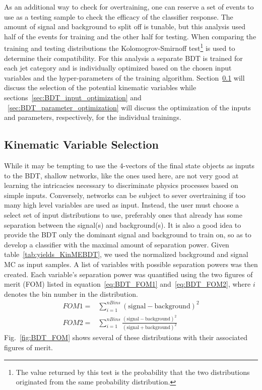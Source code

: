 As an additional way to check for overtraining, one can reserve a set of events to use as a testing sample to check the efficacy of the classifier response.
The amount of signal and background to split off is tunable, but this analysis used half of the events for training and the other half for testing.
When comparing the training and testing distributions the Kolomogrov-Smirnoff test\footnote{The value returned by this test is the probability that the two distributions originated from the same probability distribution.} is used to determine their compatibility.
For this analysis a separate BDT is trained for each jet category and is individually optimized based on the chosen input variables and the hyper-parameters of the training algorithm.
Section~\ref{sec:kin_var_sel} will discuss the selection of the potential kinematic variables while sections~\ref{sec:BDT_input_optimization} and ~\ref{sec:BDT_parameter_optimization} will discuss the optimization of the inputs and parameters, respectively, for the individual trainings.

\subsection{Kinematic Variable Selection}
\label{sec:kin_var_sel}

While it may be tempting to use the 4-vectors of the final state objects as inputs to the BDT, shallow networks, like the ones used here, are not very good at learning the intricacies necessary to discriminate physics processes based on simple inputs.
Conversely, networks can be subject to sever overtraining if too many high level variables are used as input.
Instead, the user must choose a select set of input distributions to use, preferably ones that already has some separation between the signal(s) and  background(s).
It is also a good idea to provide the BDT only the dominant signal and background to train on, so as to develop a classifier with the maximal amount of separation power.
Given table~\ref{tab:yields_KinMEBDT}, we used the normalized \Wjets background and \HWW signal MC as input samples.
A list of variables with possible separation powers was then created.
Each variable's separation power was quantified using the two figures of merit (FOM) listed in equation~\ref{eq:BDT_FOM1} and~\ref{eq:BDT_FOM2}, where $i$ denotes the bin number in the distribution.
\begin{align}
  FOM1 = {}& \sum_{i=1}^{nBins}\left(\text{signal}-\text{background}\right)^{2}\label{eq:BDT_FOM1}\\
  FOM2 = {}& \sum_{i=1}^{nBins}\frac{\left(\text{signal}-\text{background}\right)^{2}}{\left(\text{signal}+\text{background}\right)^{2}}\label{eq:BDT_FOM2}
\end{align}
Fig.~\ref{fig:BDT_FOM} shows several of these distributions with their associated figures of merit.

